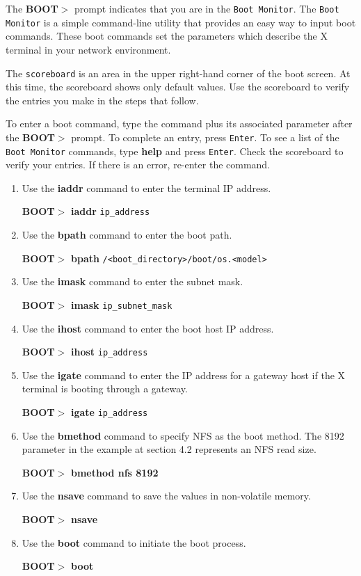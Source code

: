 \documentclass[11pt]{article}
\begin{document}
The {\bf BOOT$>$} prompt indicates that you are in the {\tt Boot Monitor}. The
{\tt Boot Monitor} is a simple command-line utility that provides an easy way
to input boot commands. These boot commands set the parameters which describe
the X terminal in your network environment.

The {\tt scoreboard} is an area in the upper right-hand corner of the boot
screen. At this time, the scoreboard shows only default values. Use the
scoreboard to verify the entries you make in the steps that follow.

To enter a boot command, type the command plus its associated parameter after
the {\bf BOOT$>$} prompt. To complete an entry, press {\tt Enter}. To see a list
of the {\tt Boot Monitor} commands, type {\bf help} and press {\tt Enter}. Check
the scoreboard to verify your entries. If there is an error, re-enter the
command.

\begin {enumerate}

\item Use the {\bf iaddr} command to enter the terminal IP address.

{\bf BOOT$>$} {\bf iaddr} {\tt ip\_address}

\item Use the {\bf bpath} command to enter the boot path.

{\bf BOOT$>$} {\bf bpath} {\tt /<boot\_directory>/boot/os.<model>}

\item Use the {\bf imask} command to enter the subnet mask.

{\bf BOOT$>$} {\bf imask} {\tt ip\_subnet\_mask}

\item Use the {\bf ihost} command to enter the boot host IP address.

{\bf BOOT$>$} {\bf ihost} {\tt ip\_address}

\item Use the {\bf igate} command to enter the IP address for a gateway host if
the X terminal is booting through a gateway.

{\bf BOOT$>$} {\bf igate} {\tt ip\_address}

\item Use the {\bf bmethod} command to specify NFS as the boot method. The 8192
parameter in the example at section 4.2 represents an NFS read size.

{\bf BOOT$>$} {\bf bmethod nfs 8192}

\item Use the {\bf nsave} command to save the values in non-volatile memory.

{\bf BOOT$>$} {\bf nsave}

\item Use the {\bf boot} command to initiate the boot process.

{\bf BOOT$>$} {\bf boot}

\end {enumerate}
\end{document}
